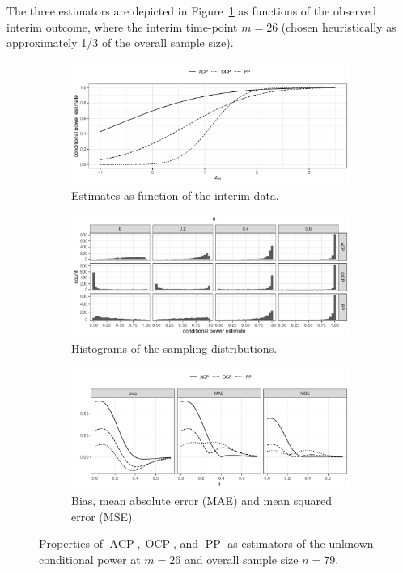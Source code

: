 \documentclass[12pt]{article}
\newcommand{\ACP}{\ensuremath{\operatorname{ACP}}}
\newcommand{\OCP}{\ensuremath{\operatorname{OCP}}}
\newcommand{\PP}{\ensuremath{\operatorname{PP}}}
\begin{document}
The three estimators are depicted in Figure~\ref{fig:acp-ocp-pp-comparison-absolute} as functions
of the observed interim outcome, where the interim time-point $m = 26$ (chosen heuristically as approximately 1/3 of the overall sample size).
\begin{figure}
    \centering
    \begin{subfigure}[b]{\textwidth}
        \centering
        \includegraphics[width=.85\textwidth]{figures/acp_ocp_pp_example}
        \caption{%
            Estimates as function of the interim data.
        }
        \label{fig:acp-ocp-pp-comparison-absolute}
    \end{subfigure}
    \begin{subfigure}[b]{\textwidth}
        \centering
        \includegraphics[width=.85\textwidth]{figures/acp_ocp_pp_sampling_distributions}
        \caption{%
            Histograms of the sampling distributions.
        }
        \label{fig:sampling-distributions}
    \end{subfigure}
    \begin{subfigure}[b]{\textwidth}
        \centering
        \includegraphics[width=.85\textwidth]{figures/acp_ocp_pp_bias_mae_mse}
        \caption{%
            Bias, mean absolute error (MAE) and mean squared error (MSE).
        }
        \label{fig:acp-ocp-pp-as-estimators}
    \end{subfigure}
    \caption{%
        Properties of $\ACP,\OCP$, and $\PP$ as estimators of the unknown conditional power at $m=26$ and overall sample size $n=79$.
    }
\end{figure}
\end{document}
